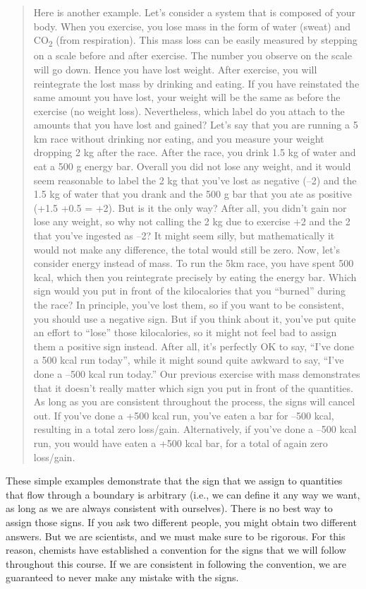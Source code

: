 \documentclass[
  9pt,
]{extbook}
\theoremstyle{definition}
\theoremstyle{definition}
\theoremstyle{definition}
\theoremstyle{remark}
\begin{document}
\begin{quote}
Here is another example. Let's consider a system that is composed of your body. When you exercise, you lose mass in the form of water (sweat) and CO\textsubscript{2} (from respiration). This mass loss can be easily measured by stepping on a scale before and after exercise. The number you observe on the scale will go down. Hence you have lost weight. After exercise, you will reintegrate the lost mass by drinking and eating. If you have reinstated the same amount you have lost, your weight will be the same as before the exercise (no weight loss). Nevertheless, which label do you attach to the amounts that you have lost and gained? Let's say that you are running a 5 km race without drinking nor eating, and you measure your weight dropping 2 kg after the race. After the race, you drink 1.5 kg of water and eat a 500 g energy bar. Overall you did not lose any weight, and it would seem reasonable to label the 2 kg that you've lost as negative (--2) and the 1.5 kg of water that you drank and the 500 g bar that you ate as positive (+1.5 +0.5 = +2). But is it the only way? After all, you didn't gain nor lose any weight, so why not calling the 2 kg due to exercise +2 and the 2 that you've ingested as --2? It might seem silly, but mathematically it would not make any difference, the total would still be zero. Now, let's consider energy instead of mass. To run the 5km race, you have spent 500 kcal, which then you reintegrate precisely by eating the energy bar. Which sign would you put in front of the kilocalories that you ``burned'' during the race? In principle, you've lost them, so if you want to be consistent, you should use a negative sign. But if you think about it, you've put quite an effort to ``lose'' those kilocalories, so it might not feel bad to assign them a positive sign instead. After all, it's perfectly OK to say, ``I've done a 500 kcal run today'', while it might sound quite awkward to say, ``I've done a --500 kcal run today.'' Our previous exercise with mass demonstrates that it doesn't really matter which sign you put in front of the quantities. As long as you are consistent throughout the process, the signs will cancel out. If you've done a +500 kcal run, you've eaten a bar for --500 kcal, resulting in a total zero loss/gain. Alternatively, if you've done a --500 kcal run, you would have eaten a +500 kcal bar, for a total of again zero loss/gain.
\end{quote}

These simple examples demonstrate that the sign that we assign to quantities that flow through a boundary is arbitrary (i.e., we can define it any way we want, as long as we are always consistent with ourselves). There is no best way to assign those signs. If you ask two different people, you might obtain two different answers. But we are scientists, and we must make sure to be rigorous. For this reason, chemists have established a convention for the signs that we will follow throughout this course. If we are consistent in following the convention, we are guaranteed to never make any mistake with the signs.
\end{document}

